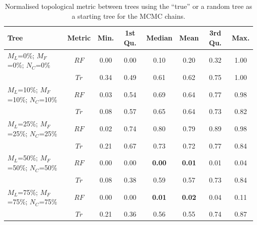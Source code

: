 \documentclass[12pt,letterpaper]{article}
\begin{document}
\begin{table}[!ht]
\caption{Normalised topological metric between trees using the ``true'' or a random tree as a starting tree for the MCMC chains.}
\centering
\begin{tabular}{|l|c|c|c|c|c|c|c|}
  \hline
 Tree &  Metric & Min. & 1st Qu. & Median & Mean & 3rd Qu. & Max. \\ 
  \hline
    $M_L$=0\%; $M_F$=0\%; $N_C$=0\%          & $RF$ & 0.00 & 0.00 & 0.10 & 0.20 & 0.32 & 1.00 \\ 
                                             & $Tr$ & 0.34 & 0.49 & 0.61 & 0.62 & 0.75 & 1.00 \\ 
    $M_L$=10\%; $M_F$=10\%; $N_C$=10\%       & $RF$ & 0.03 & 0.54 & 0.69 & 0.64 & 0.77 & 0.98 \\ 
                                             & $Tr$ & 0.08 & 0.57 & 0.65 & 0.64 & 0.73 & 0.82 \\ 
    $M_L$=25\%; $M_F$=25\%; $N_C$=25\%       & $RF$ & 0.02 & 0.74 & 0.80 & 0.79 & 0.89 & 0.98 \\ 
                                             & $Tr$ & 0.21 & 0.67 & 0.73 & 0.72 & 0.77 & 0.84 \\ 
    $M_L$=50\%; $M_F$=50\%; $N_C$=50\%       & $RF$ & 0.00 & 0.00 & \textbf{0.00} & \textbf{0.01} & 0.01 & 0.04 \\ 
                                             & $Tr$ & 0.08 & 0.38 & 0.59 & 0.57 & 0.73 & 0.84 \\ 
    $M_L$=75\%; $M_F$=75\%; $N_C$=75\%       & $RF$ & 0.00 & 0.00 & \textbf{0.01} & \textbf{0.02} & 0.04 & 0.11 \\ 
                                             & $Tr$ & 0.21 & 0.36 & 0.56 & 0.55 & 0.74 & 0.87 \\ 
   \hline
\end{tabular}
\label{Tab_Results-Difference_methods}
\end{table}

\end{document}
